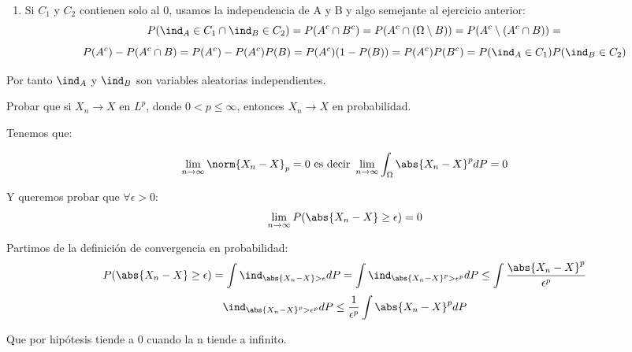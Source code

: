 \begin{problem}[2]
\begin{enumerate}
\item Si $C_1$ y $C_2$ contienen solo al 0, usamos la independencia de A y B y algo semejante al ejercicio anterior:
\[
P(\ind_A \in C_1 \cap \ind_B \in C_2) = P(A^c \cap B^c) = P(A^c\cap(\Omega \setminus B)) = P(A^c \setminus (A^c \cap B)) =
\]
\[
P(A^c)-P(A^c \cap B)=P(A^c)-P(A^c)P(B)= P(A^c)(1-P(B))=P(A^c)P(B^c) = P(\ind_A \in C_1)P(\ind_B \in C_2)
\]


\end{enumerate}


Por tanto $\ind_A$ y $\ind_B$ son variables aleatorias independientes.

\end{problem}


\begin{problem}[3]Probar que si $X_n\to  X$ en $L^p$, donde  $0 < p \le \infty$, entonces $X_n\to  X$ en probabilidad.


\solution


Tenemos que:

\[
\lim_{n \rightarrow \infty} \norm{X_n -X}_p = 0 \text{ es decir } \lim_{n \rightarrow \infty} \int_{\Omega} \abs{X_n -X}^p dP = 0
\]

Y queremos probar que $\forall \epsilon > 0$: 
\[
\lim_{n \rightarrow \infty} P(\abs{X_n -X}\geq \epsilon) = 0
\]

Partimos de la definición de convergencia en probabilidad:
\[
P(\abs{X_n -X}\geq \epsilon) = \int \ind_{\abs{X_n - X}> \epsilon}dP = \int \ind_{\abs{X_n - X}^p> \epsilon^p}dP \leq \int \frac{\abs{X_n - X}^p}{\epsilon^p}
\]
\[ \ind_{\abs{X_n - X}^p> \epsilon^p}dP \leq \frac{1}{\epsilon^p}  \int \abs{X_n - X}^p dP
\]

Que por hipótesis tiende a 0 cuando la n tiende a infinito.



\end{problem}


